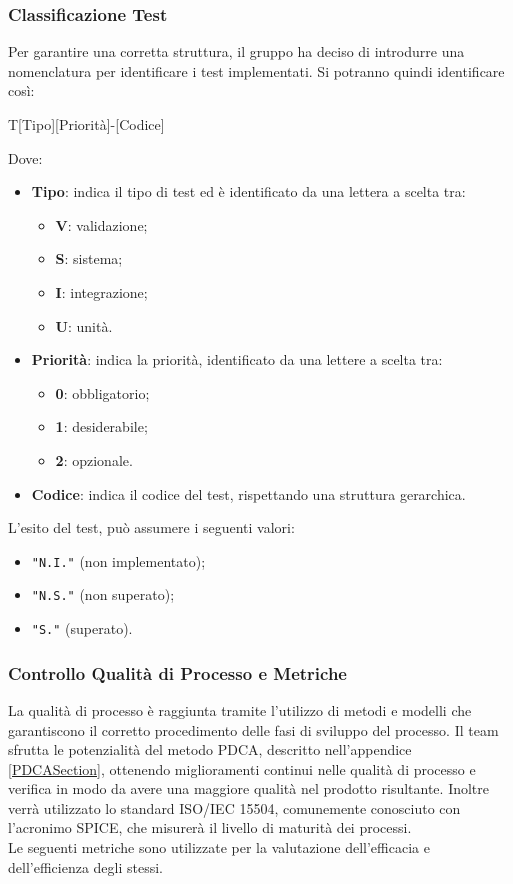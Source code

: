 \subsubsection{Classificazione Test}\label{Class_test}
Per garantire una corretta struttura, il gruppo ha deciso di introdurre una nomenclatura per identificare i test implementati. Si potranno quindi identificare così: 

\begin{center}
	T[Tipo][Priorità]-[Codice]
\end{center}
	Dove: 
	\begin{itemize}
		\item \textbf{Tipo}: indica il tipo di test ed è identificato da una lettera a scelta tra: 

		\begin{itemize}
			\item \textbf{V}: validazione; 
			\item \textbf{S}: sistema; 
			\item \textbf{I}: integrazione; 
			\item \textbf{U}: unità.
		\end{itemize}
		
		\item \textbf{Priorità}: indica la priorità, identificato da una lettere a scelta tra: 
		\begin{itemize}
			\item \textbf{0}: obbligatorio; 
			\item \textbf{1}: desiderabile; 
			\item \textbf{2}: opzionale.
		\end{itemize}				
		\item \textbf{Codice}: indica il codice del test, rispettando una struttura gerarchica. 
	\end{itemize}
	
	L'esito del test, può assumere i seguenti valori: 
		\begin{itemize}
		\item \texttt{"N.I."} (non implementato);
		\item \texttt{"N.S."} (non superato); 
		\item \texttt{"S."} (superato). 
		\end{itemize}


\subsubsection{Controllo Qualità di Processo e Metriche} \label{ControlloQualita_Processo}
La qualità di processo è raggiunta tramite l'utilizzo di metodi e modelli che garantiscono il corretto procedimento delle fasi di sviluppo del processo. Il team sfrutta le potenzialità del metodo PDCA, descritto nell'appendice \ref{PDCASection}, ottenendo miglioramenti continui nelle qualità di processo e verifica in modo da avere una maggiore qualità nel prodotto risultante. Inoltre verrà utilizzato lo standard ISO/IEC 15504, comunemente conosciuto con l'acronimo SPICE, che misurerà il livello di maturità dei processi.\-\\
Le seguenti metriche sono utilizzate per la valutazione dell'efficacia e dell'efficienza degli stessi.

